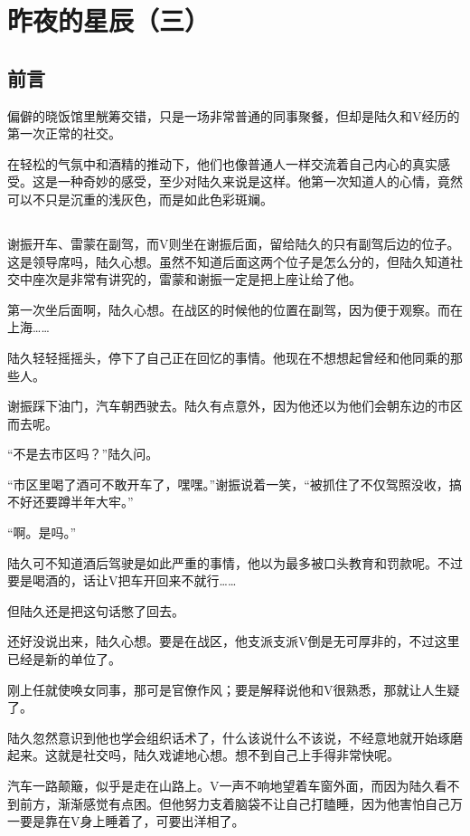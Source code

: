 \chapter{昨夜的星辰（三）}

\section*{前言}
偏僻的晓饭馆里觥筹交错，只是一场非常普通的同事聚餐，但却是陆久和V经历的第一次正常的社交。

在轻松的气氛中和酒精的推动下，他们也像普通人一样交流着自己内心的真实感受。这是一种奇妙的感受，至少对陆久来说是这样。他第一次知道人的心情，竟然可以不只是沉重的浅灰色，而是如此色彩斑斓。

\lineseparator

\section*{}

谢振开车、雷蒙在副驾，而V则坐在谢振后面，留给陆久的只有副驾后边的位子。这是领导席吗，陆久心想。虽然不知道后面这两个位子是怎么分的，但陆久知道社交中座次是非常有讲究的，雷蒙和谢振一定是把上座让给了他。

第一次坐后面啊，陆久心想。在战区的时候他的位置在副驾，因为便于观察。而在上海……

陆久轻轻摇摇头，停下了自己正在回忆的事情。他现在不想想起曾经和他同乘的那些人。

谢振踩下油门，汽车朝西驶去。陆久有点意外，因为他还以为他们会朝东边的市区而去呢。

“不是去市区吗？”陆久问。

“市区里喝了酒可不敢开车了，嘿嘿。”谢振说着一笑，“被抓住了不仅驾照没收，搞不好还要蹲半年大牢。”

“啊。是吗。”

陆久可不知道酒后驾驶是如此严重的事情，他以为最多被口头教育和罚款呢。不过要是喝酒的，话让V把车开回来不就行……

但陆久还是把这句话憋了回去。

还好没说出来，陆久心想。要是在战区，他支派支派V倒是无可厚非的，不过这里已经是新的单位了。

刚上任就使唤女同事，那可是官僚作风；要是解释说他和V很熟悉，那就让人生疑了。

陆久忽然意识到他也学会组织话术了，什么该说什么不该说，不经意地就开始琢磨起来。这就是社交吗，陆久戏谑地心想。想不到自己上手得非常快呢。

汽车一路颠簸，似乎是走在山路上。V一声不响地望着车窗外面，而因为陆久看不到前方，渐渐感觉有点困。但他努力支着脑袋不让自己打瞌睡，因为他害怕自己万一要是靠在V身上睡着了，可要出洋相了。

